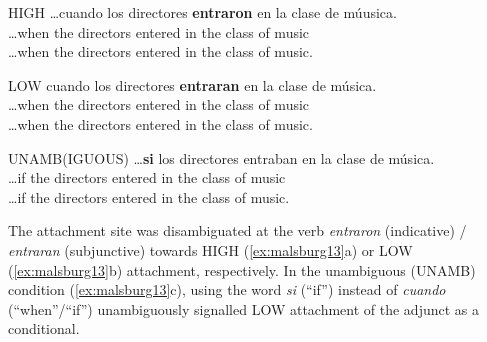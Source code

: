 \documentclass{cambridge7A}\usepackage[]{graphicx}\usepackage[]{color}
\begin{document}
\begin{exe}
\ex\label{ex:malsburg13} 
\begin{xlist}
\item HIGH
\gll \dots cuando los directores \textbf{entraron} en la clase de m{\'u}usica. \\
\dots when the directors entered in the class of music\\
\glt \dots when the directors entered in the class of music.
\item LOW
\gll cuando los directores \textbf{entraran} en la clase de m{\'u}sica.\\
\dots when the directors entered in the class of music\\
\glt \dots when the directors entered in the class of music.
\item  UNAMB(IGUOUS)
\gll \dots \textbf{si} los directores entraban en la clase de m{\'u}sica.\\
\dots if the directors entered in the class of music\\
\glt \dots if the directors entered in the class of music.
\end{xlist}
\end{exe}

The attachment site was disambiguated at the verb \textit{entraron} (indicative) / \textit{entraran} (subjunctive) towards HIGH (\ref{ex:malsburg13}a) or LOW (\ref{ex:malsburg13}b) attachment, respectively. In the unambiguous (UNAMB) condition (\ref{ex:malsburg13}c), using the word \textit{si} (``if'') instead of \textit{cuando} (``when''/``if'') unambiguously signalled LOW attachment of the adjunct as a conditional.
\end{document}
